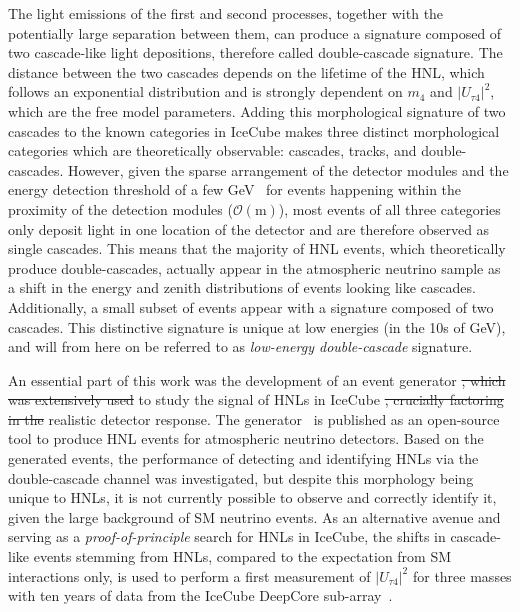 \documentclass[
    aps,
    prd,
    reprint,
    amsmath,
    amssymb,
    nofootinbib,
    superscriptaddress,
    floatfix
]{revtex4-2}
\newcommand{\gev}{\giga\electronvolt}
\def\ut4{$|U_{\tau4}|^2$}
\providecommand{\DIFaddtex}[1]{{\protect\color{blue}\uwave{#1}}} %
\providecommand{\DIFdeltex}[1]{{\protect\color{red}\sout{#1}}}                      %
\providecommand{\DIFaddbegin}{} %
\providecommand{\DIFaddend}{} %
\providecommand{\DIFdelbegin}{} %
\providecommand{\DIFdelend}{} %
\providecommand{\DIFadd}[1]{\texorpdfstring{\DIFaddtex{#1}}{#1}} %
\providecommand{\DIFdel}[1]{\texorpdfstring{\DIFdeltex{#1}}{}} %
\newcommand{\DIFscaledelfig}{0.5}
\newlength{\DIFdelgraphicswidth} %
\newlength{\DIFdelgraphicsheight} %
\newcommand{\DIFaddincludegraphics}[2][]{{\color{blue}\fbox{\DIFOincludegraphics[#1]{#2}}}} %
\newcommand{\DIFdelincludegraphics}[2][]{%
\sbox{\DIFdelgraphicsbox}{\DIFOincludegraphics[#1]{#2}}%
\settoboxwidth{\DIFdelgraphicswidth}{\DIFdelgraphicsbox} %
\settoboxtotalheight{\DIFdelgraphicsheight}{\DIFdelgraphicsbox} %
\scalebox{\DIFscaledelfig}{%
\parbox[b]{\DIFdelgraphicswidth}{\usebox{\DIFdelgraphicsbox}\\[-\baselineskip] \rule{\DIFdelgraphicswidth}{0em}}\llap{\resizebox{\DIFdelgraphicswidth}{\DIFdelgraphicsheight}{%
\setlength{\unitlength}{\DIFdelgraphicswidth}%
\begin{picture}(1,1)%
\thicklines\linethickness{2pt} %
{\color[rgb]{1,0,0}\put(0,0){\framebox(1,1){}}}%
{\color[rgb]{1,0,0}\put(0,0){\line( 1,1){1}}}%
{\color[rgb]{1,0,0}\put(0,1){\line(1,-1){1}}}%
\end{picture}%
}\hspace*{3pt}}} %
} %
\DeclareRobustCommand{\DIFaddbegin}{\DIFOaddbegin \let\includegraphics\DIFaddincludegraphics} %
\DeclareRobustCommand{\DIFaddend}{\DIFOaddend \let\includegraphics\DIFOincludegraphics} %
\DeclareRobustCommand{\DIFdelbegin}{\DIFOdelbegin \let\includegraphics\DIFdelincludegraphics} %
\DeclareRobustCommand{\DIFdelend}{\DIFOaddend \let\includegraphics\DIFOincludegraphics} %
\begin{document}
The light emissions of the first and second processes, together with the potentially large separation between them, can produce a signature composed of two cascade-like light depositions, therefore called double-cascade signature.
The distance between the two cascades depends on the lifetime of the HNL, which follows an exponential distribution and is strongly dependent on $m_4$ and \ut4, which are the free model parameters.
Adding this morphological signature of two cascades to the known categories in IceCube makes three distinct morphological categories which are theoretically observable: cascades, tracks, and double-cascades.
However, given the sparse arrangement of the detector modules and the energy detection threshold of a few \si{\gev}~\cite{IceCube:2022kff} for events happening within the proximity of the detection modules ($\mathcal{O}(\si{\meter})$), most events of all three categories only deposit light in one location of the detector and are therefore observed as single cascades.
This means that the majority of HNL events, which theoretically produce double-cascades, actually appear in the atmospheric neutrino sample as a shift in the energy and zenith distributions of events looking like cascades. Additionally, a small subset of events appear with a signature composed of two cascades. This distinctive signature is unique at low energies (in the 10s of GeV), and will from here on be referred to as \textit{low-energy double-cascade} signature.

An essential part of this work was the development of an event generator \DIFdelbegin \DIFdel{, which was extensively used }\DIFdelend to study the signal of HNLs in IceCube \DIFdelbegin \DIFdel{, crucially factoring in the }\DIFdelend \DIFaddbegin \DIFadd{with a }\DIFaddend realistic detector response.
The generator~\cite{LeptonInjector-HNL} is published as an open-source tool to produce HNL events for atmospheric neutrino detectors. 
Based on the generated events, the performance of detecting and identifying HNLs via the double-cascade channel was investigated, but despite this morphology being unique to HNLs, it is not currently possible to observe and correctly identify it, given the large background of SM neutrino events.
As an alternative avenue and serving as a \textit{proof-of-principle} search for HNLs in IceCube, the shifts in cascade-like events stemming from HNLs, compared to the expectation from SM interactions only, is used to perform a first measurement of \ut4 for three masses with ten years of data from the IceCube DeepCore sub-array~\cite{IceCube:2011ucd}.
\end{document}

